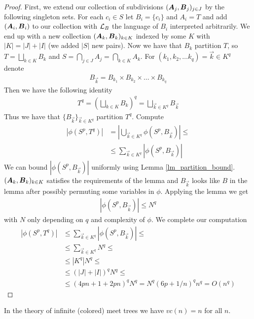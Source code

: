 \documentclass{amsart}
\DeclareMathOperator{\A}{\boldface A}
\DeclareMathOperator{\B}{\boldface B}
\begin{document}
\begin{proof}
	First, we extend our collection of subdivisions $(\A_j, \B_j)_{j \in J}$ by the following singleton sets. For each $c_i \in S$ let $B_i = \{c_i\}$ and $A_i = T$ and add $(\A_i, \B_i)$ to our collection with $\mathcal L_B$ the language of $B_i$ interpreted arbitrarily. We end up with a new collection $(\A_k, \B_k)_{k \in K}$ indexed by some $K$ with $|K| = |J| + |I|$ (we added $|S|$ new pairs). Now we have that $B_k$ partition $T$, so $T = \bigsqcup_{k \in K} B_k$ and $S = \bigcap_{j \in J} A_j = \bigcap_{k \in K} A_k$. For $(k_1, k_2, \ldots k_q) = \vec k \in K^q$ denote 
	\begin{align*}
		B_{\vec k} = B_{k_1} \times B_{k_2} \times \ldots \times B_{k_q}
	\end{align*}
	Then we have the following identity
	\begin{align*}
		T^q = (\bigsqcup_{k \in K} B_k)^q = \bigsqcup_{\vec k \in K^q} B_{\vec k}
	\end{align*}
	Thus we have that $\{B_{\vec k}\}_{\vec k \in K^q}$ partition $T^q$. Compute
	\begin{align*}
		|\phi(S^p, T^q)|
		&= \left|\bigcup_{\vec k \in K^q} \phi(S^p, B_{\vec k}) \right| \leq \\
		&\leq \sum_{\vec k \in K^q} |\phi(S^p, B_{\vec k})|
	\end{align*}
	We can bound $|\phi(S^p, B_{\vec k})|$ uniformly using Lemma \ref{lm_partition_bound}. $(\A_k, \B_k)_{k \in K}$ satisfies the requirements of the lemma and $B_{\vec k}$ looks like $B$ in the lemma after possibly permuting some variables in $\phi$. Applying the lemma we get
	\begin{align*}
		|\phi(S^p, B_{\vec k})| \leq N^q
	\end{align*}
	with $N$ only depending on $q$ and complexity of $\phi$. We complete our computation
	\begin{align*}
		|\phi(S^p, T^q)|
		&\leq \sum_{\vec k \in K^q} |\phi(S^p, B_{\vec k})| \leq \\
		&\leq \sum_{\vec k \in K^q} N^q \leq \\
		&\leq |K^q| N^q \leq \\
		&\leq (|J| + |I|)^q N^q \leq \\
		&\leq (4pn + 1 + 2pn)^q N^q = N^q (6p + 1/n)^q n^q = O(n^q)
	\end{align*}
	\end{proof}
	\begin{Corollary}
		In the theory of infinite (colored) meet trees we have $vc(n) = n$ for all $n$.
	\end{Corollary}
\end{document}

